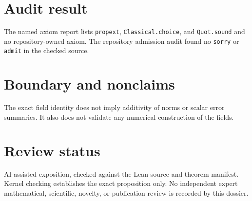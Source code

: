 \documentclass[11pt]{article}
\begin{document}
\section{Audit result}
The named axiom report lists \texttt{propext}, \texttt{Classical.choice}, and
\texttt{Quot.sound} and no repository-owned axiom.  The repository admission audit found no
\texttt{sorry} or \texttt{admit} in the checked source.

\section{Boundary and nonclaims}
The exact field identity does not imply additivity of norms or scalar error summaries.  It also does not validate any numerical construction of the fields.

\section{Review status}
AI-assisted exposition, checked against the Lean source and theorem manifest.  Kernel checking
establishes the exact proposition only.  No independent expert mathematical, scientific,
novelty, or publication review is recorded by this dossier.
\end{document}
